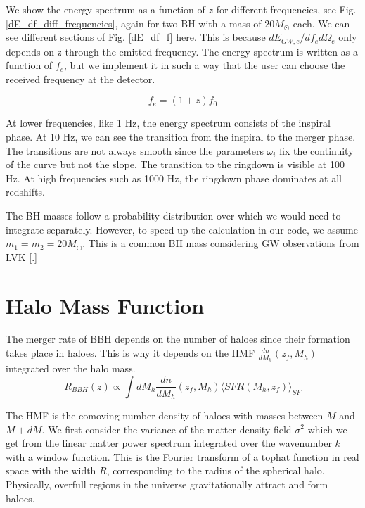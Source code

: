 We show the energy spectrum as a function of $z$ for different frequencies, see Fig. \ref{dE_df_diff_frequencies}, again for two BH with a mass of $20 M_\odot$ each. We can see different sections of Fig. \ref{dE_df_f} here. This is because $d E_{GW,e}/df_e d\Omega_e$ only depends on z through the emitted frequency. The energy spectrum is written as a function of $f_e$, but we implement it in such a way that the user can choose the received frequency at the detector.

\begin{equation}
    f_e = (1+z)f_0
\end{equation}

At lower frequencies, like 1 Hz, the energy spectrum consists of the inspiral phase. At 10 Hz, we can see the transition from the inspiral to the merger phase. The transitions are not always smooth since the parameters $\omega_i$ fix the continuity of the curve but not the slope. The transition to the ringdown is visible at 100 Hz. At high frequencies such as 1000 Hz, the ringdown phase dominates at all redshifts.

The BH masses follow a probability distribution over which we would need to integrate separately. However, to speed up the calculation in our code, we assume $m_1 = m_2 = 20M_\odot$. This is a common BH mass considering GW observations from LVK [\cite{the_ligo_scientific_collaboration_population_2022}.]



\section{Halo Mass Function}
\label{hmf_section}
The merger rate of BBH depends on the number of haloes since their formation takes place in haloes. This is why it depends on the HMF $\frac{dn}{dM_h}(z_f, M_h)$ integrated over the halo mass. 
\begin{equation}
    R_{BBH}(z) \propto \int dM_h \frac{dn}{dM_h}(z_f, M_h)\langle SFR(M_h, z_f)\rangle_{SF}
\end{equation}

The HMF is the comoving number density of haloes with masses between $M$ and $M+dM$. We first consider the variance of the matter density field $\sigma^2$ which we get from the linear matter power spectrum integrated over the wavenumber $k$ with a window function. This is the Fourier transform of a tophat function in real space with the width $R$, corresponding to the radius of the spherical halo. Physically, overfull regions in the universe gravitationally attract and form haloes.

